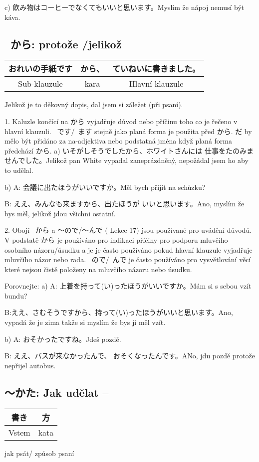 c) 飲み物はコーヒーでなくてもいいと思います。Myslím že nápoj nemusí být káva.


\subsection{~から: protože /jelikož}
\begin{tabular}{|c|c|c|}
\hline
おれいの手紙です& から、 &ていねいに書きました。\\
\hline
Sub-klauzule&kara&Hlavní klauzule\\
\hline
\end{tabular}
Jelikož je to děkovný dopis, dal jsem si záležet (při psaní).

1. Kaluzle končící na から vyjadřuje důvod nebo příčinu toho co je řečeno v hlavní klauzuli.
~です/~ます stejně jako planá forma je použita před から. だ by mělo být přidáno za na-adjektiva nebo podstatná jména když planá forma předchází から.
a) いそがしそうでしたから、ホワイトさんには 仕事をたのみませんでした。Jelikož pan White vypadal zaneprázdněný, nepožádal jsem ho aby to udělal.

b) A: 会議に出たほうがいいですか。Měl bych přijít na schůzku?

B: ええ、みんなも来ますから、出たほうが いいと思います。Ano, myslím že bys měl, jelikož jdou všichni ostatní.


2. Obojí ~から a 〜ので/〜んで ( Lekce 17) jsou používané pro uvádění důvodů. V podstatě から je používáno pro indikaci příčiny pro podporu mluvčího osobního názoru/úsudku a je je často používáno pokud hlavní klauzule vyjadřuje mluvčího názor nebo rada. ~ので/~んで  je často používáno pro vysvětlování věcí které nejsou čistě položeny na mluvčího názoru nebo úsudku.


Porovnejte:
a) A: 上着を持って(い)ったほうがいいですか。Mám si s sebou vzít bundu?

B:ええ、さむそうですから、持って(い)ったほうがいいと思います。Ano, vypadá že je zima takže si myslím že bys ji měl vzít.

b) A: おそかったですね。Jdeš pozdě.

B: ええ、バスが来なかったんで、 おそくなったんです。ANo, jdu pozdě protože nepřijel autobus.

\subsection{〜かた: Jak udělat --}
\begin{tabular}{|c|c|}
\hline
書き&方\\
\hline
Vstem&kata\\
\hline
\end{tabular}
jak psát/ způsob psaní

